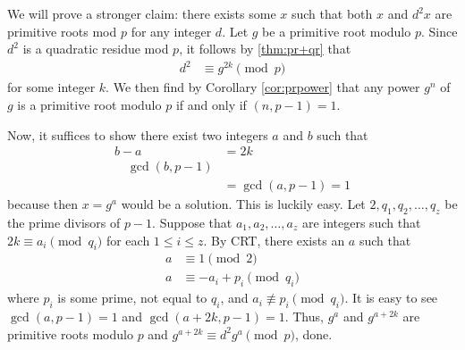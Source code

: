 \documentclass{subfile}
\begin{document}
	\begin{solution}
		We will prove a stronger claim: there exists some $x$ such that both $x$ and $d^2x$ are primitive roots mod $p$ for any integer $d$. Let $g$ be a primitive root modulo $p$. Since $d^2$ is a quadratic residue mod $p$, it follows by \autoref{thm:pr+qr} that
			\begin{align*}
				d^2
					& \equiv g^{2k} \pmod{p}
			\end{align*}
		for some integer $k$. We then find by Corollary \ref{cor:prpower} that any power $g^n$ of $g$ is a primitive root modulo $p$ if and only if $(n, p-1)=1$.

		Now, it suffices to show there exist two integers $a$ and $b$ such that
			\begin{align*}
				b-a
					& = 2k\\
				\quad \gcd(b,p-1)\\
					& = \gcd(a,p-1) = 1
			\end{align*}
		because then $x=g^a$ would be a solution.
		This is luckily easy. Let $2,q_1,q_2,\ldots,q_z$ be the prime divisors of $p-1$. Suppose that $a_1,a_2,\ldots,a_z$ are integers such that $2k \equiv a_i \pmod{q_i}$ for each $1 \le i \le z$.
		By CRT, there exists an $a$ such that
			\begin{align*}
				a
					& \equiv 1 \pmod{2}\\
				a
					& \equiv -a_i + p_i \pmod{q_i}
			\end{align*}
		where $p_i$ is some prime, not equal to $q_i$, and $a_i \not \equiv p_i \pmod{q_i}$. It is easy to see $\gcd(a,p-1) = 1$ and $\gcd(a+2k, p-1) = 1$. Thus, $g^a$ and $g^{a+2k}$ are primitive roots modulo $p$ and $g^{a+2k} \equiv d^2g^a \pmod{p}$, done.
	\end{solution}
\end{document}

